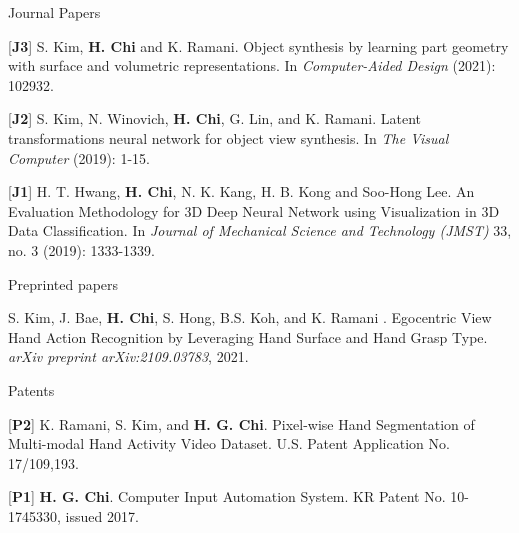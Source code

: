 \begin{cventries}

\cvpub
{Journal Papers} %
{ %
\begin{cvitems}
\item {[\textbf{J3}] S. Kim, \textbf{H. Chi} and K. Ramani. Object synthesis by learning part geometry with surface and volumetric representations. In \textit{Computer-Aided Design} (2021): 102932.}
\item {[\textbf{J2}] S. Kim, N. Winovich, \textbf{H. Chi}, G. Lin, and K. Ramani. Latent transformations neural network for object view synthesis. In \textit{The Visual Computer} (2019): 1-15.}
\item {[\textbf{J1}] H. T. Hwang, \textbf{H. Chi}, N. K. Kang, H. B. Kong and Soo-Hong Lee. An Evaluation Methodology for 3D Deep Neural Network using Visualization in 3D Data Classification. In \textit{Journal of Mechanical Science and Technology (JMST)} 33, no. 3 (2019): 1333-1339.}
\end{cvitems}
}

\cvpub
{Preprinted papers} %
{
\begin{cvitems}
\item {S. Kim, J. Bae, \textbf{H. Chi}, S. Hong, B.S. Koh, and K. Ramani . Egocentric View Hand Action Recognition by Leveraging Hand Surface and Hand Grasp Type. \textit{arXiv preprint arXiv:2109.03783}, 2021. }
\end{cvitems}
}

\cvpub
{Patents}{
\begin{cvitems}
\item {[\textbf{P2}] K. Ramani, S. Kim, and \textbf{H. G. Chi}. Pixel-wise Hand Segmentation of Multi-modal Hand Activity Video Dataset. U.S. Patent Application No. 17/109,193.}
\item {[\textbf{P1}] \textbf{H. G. Chi}. Computer Input Automation System. KR Patent No. 10-1745330, issued 2017.}
\end{cvitems}
}



\end{cventries}
